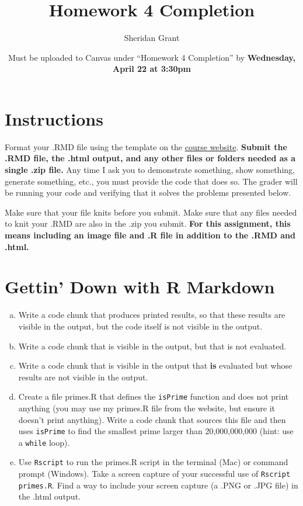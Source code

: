 \documentclass[12pt]{article}
\title{Homework 4 Completion}
\author{Sheridan Grant}
\date{Must be uploaded to Canvas under ``Homework 4 Completion'' by \textbf{Wednesday, April 22 at 3:30pm}}
\begin{document}
\sloppy

\maketitle

\section*{Instructions}

Format your .RMD file using the template on the \href{https://sheridanlgrant.github.io/teaching/STAT302_SPR2020}{course website}. \textbf{Submit the .RMD file, the .html output, and any other files or folders needed as a single .zip file.} Any time I ask you to demonstrate something, show something, generate something, etc., you must provide the code that does so. The grader will be running your code and verifying that it solves the problems presented below.

Make sure that your file knits before you submit. Make sure that any files needed to knit your .RMD are also in the .zip you submit. \textbf{For this assignment, this means including an image file and .R file in addition to the .RMD and .html.}

\section{Gettin' Down with R Markdown}

\begin{enumerate}[(a)]
	\item Write a code chunk that produces printed results, so that these results are visible in the output, but the code itself is not visible in the output.
	\item Write a code chunk that is visible in the output, but that is not evaluated.
	\item Write a code chunk that is visible in the output that \textbf{is} evaluated but whose results are not visible in the output.
	\item Create a file primes.R that defines the \verb|isPrime| function and does not print anything (you may use my primes.R file from the website, but ensure it doesn't print anything). Write a code chunk that sources this file and then uses \verb|isPrime| to find the smallest prime larger than 20,000,000,000 (hint: use a \verb|while| loop).
	\item Use \verb|Rscript| to run the primes.R script in the terminal (Mac) or command prompt (Windows). Take a screen capture of your successful use of \verb|Rscript primes.R|. Find a way to include your screen capture (a .PNG or .JPG file) in the .html output.
\end{enumerate}
\end{document}
